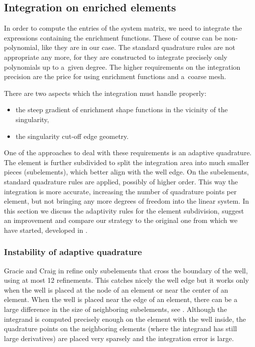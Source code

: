 \subsection{Integration on enriched elements}
\label{sec:integration}
In order to compute the entries of the system matrix, %
we need to integrate
the expressions containing the enrichment functions. These of course can be non-polynomial, like they are 
in our case. The standard quadrature rules are not appropriate any more, for they are constructed to integrate 
precisely only polynomials up to a~given degree. The higher requirements on the integration precision
are the price for using enrichment functions and a~coarse mesh.

There are two aspects which the integration must handle properly:
\begin{itemize}
  \item the steep gradient of enrichment shape functions in the vicinity of the singularity,
  \item the singularity cut-off edge geometry.
\end{itemize}

One of the approaches to deal with these requirements is an adaptive quadrature. The element is further subdivided 
to split the integration area into much smaller pieces (subelements), which better align with the well edge.
On the subelements, standard quadrature rules are applied, possibly of higher order.
This way the integration is more accurate, increasing the number of quadrature points per element, but not bringing
any more degrees of freedom into the linear system. In this section we discuss the adaptivity rules for the element subdivision, 
suggest an improvement and compare our strategy to the original one from which we have started, developed in \cite{gracie_modelling_2010}.

\subsubsection{Instability of adaptive quadrature}
\label{sec:refinement_element}
Gracie and Craig in \cite{gracie_modelling_2010} refine only subelements that cross the boundary of the well, using at most 12 refinements.
This catches nicely the well edge but it works only when the well is placed at the node of an element or near the center of an element. 
When the well is placed near the edge of an element, there can be
a large difference in the size of neighboring subelements, see . Although
the integrand is computed precisely enough on the element with the well inside, the quadrature points on the
neighboring elements (where the integrand has still large derivatives) are placed very sparsely 
and the integration error is large.

